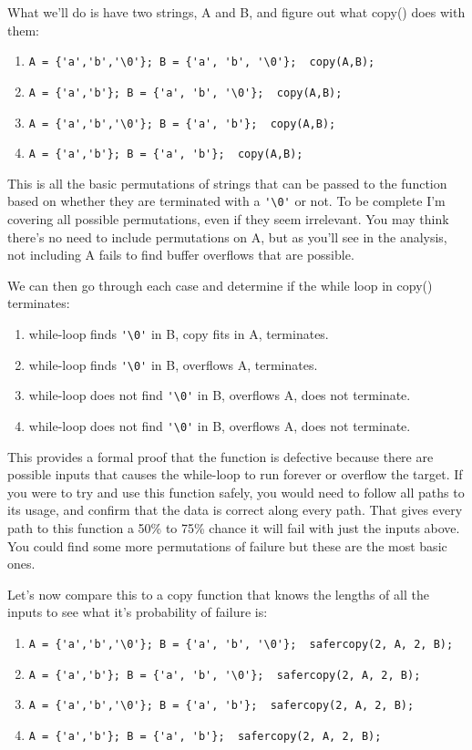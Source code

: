 What we'll do is have two strings, A and B, and figure out what copy() does
with them:

\begin{enumerate}
\item \verb|A = {'a','b','\0'}; B = {'a', 'b', '\0'};  copy(A,B);|
\item \verb|A = {'a','b'}; B = {'a', 'b', '\0'};  copy(A,B);|
\item \verb|A = {'a','b','\0'}; B = {'a', 'b'};  copy(A,B);|
\item \verb|A = {'a','b'}; B = {'a', 'b'};  copy(A,B);|
\end{enumerate}

This is all the basic permutations of strings that can be passed to the function based
on whether they are terminated with a \verb|'\0'| or not. To be complete I'm covering
all possible permutations, even if they seem irrelevant.  You may think there's no
need to include permutations on A, but as you'll see in the analysis, not including
A fails to find buffer overflows that are possible.

We can then go through each case and determine if the while loop in copy() terminates:

\begin{enumerate}
\item while-loop finds \verb|'\0'| in B, copy fits in A, terminates.
\item while-loop finds \verb|'\0'| in B, overflows A, terminates.
\item while-loop does not find \verb|'\0'| in B, overflows A, does not terminate.
\item while-loop does not find \verb|'\0'| in B, overflows A, does not terminate.
\end{enumerate}

This provides a formal proof that the function is defective because there are
possible inputs that causes the while-loop to run forever or overflow the
target.  If you were to try and use this function safely, you would need to
follow all paths to its usage, and confirm that the data is correct along every
path.  That gives every path to this function a 50\% to 75\% chance it will
fail with just the inputs above.  You could find some more permutations of
failure but these are the most basic ones.

Let's now compare this to a copy function that knows the lengths of all the inputs
to see what it's probability of failure is:

\begin{enumerate}
\item \verb|A = {'a','b','\0'}; B = {'a', 'b', '\0'};  safercopy(2, A, 2, B);|
\item \verb|A = {'a','b'}; B = {'a', 'b', '\0'};  safercopy(2, A, 2, B);|
\item \verb|A = {'a','b','\0'}; B = {'a', 'b'};  safercopy(2, A, 2, B);|
\item \verb|A = {'a','b'}; B = {'a', 'b'};  safercopy(2, A, 2, B);|
\end{enumerate}

